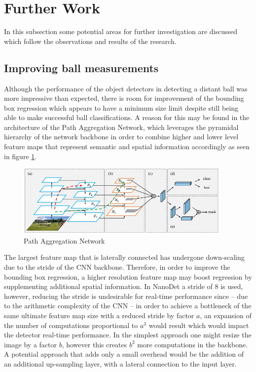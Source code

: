 \documentclass[a4paper,twoside,12pt]{report}
\begin{document}
\section{Further Work}

In this subsection some potential areas for further investigation are discussed which follow the observations and results of the research. 

\subsection{Improving ball measurements}

Although the performance of the object detectors in detecting a distant ball was more impressive than expected, there is room for improvement of the bounding box regression which appears to have a minimum size limit despite still being able to make successful ball classifications. A reason for this may be found in the architecture of the Path Aggregation Network, which leverages the pyramidal hierarchy of the network backbone in order to combine higher and lower level feature maps that represent semantic and spatial information accordingly as seen in figure \ref{fig:pan}. 

\begin{figure}[h!]
\begin{center}
\includegraphics[width=10.5cm]{images/pan.jpg}
\caption{Path Aggregation Network \citep{pan}}
\label{fig:pan}
\end{center}
\end{figure}

The largest feature map that is laterally connected has undergone down-scaling due to the stride of the CNN backbone. Therefore, in order to improve the bounding box regression, a higher resolution feature map may boost regression by supplementing additional spatial information. In NanoDet a stride of 8 is used, however, reducing the stride is undesirable for real-time performance since -- due to the arithmetic complexity of the CNN -- in order to achieve a bottleneck of the same ultimate feature map size with a reduced stride by factor $a$, an expansion of the number of computations proportional to $a^3$ would result which would impact the detector real-time performance. In the simplest approach one might resize the image by a factor $b$, however this creates $b^2$ more computations in the backbone. A potential approach that adds only a small overhead would be the addition of an additional up-sampling layer, with a lateral connection to the input layer.
\end{document}
